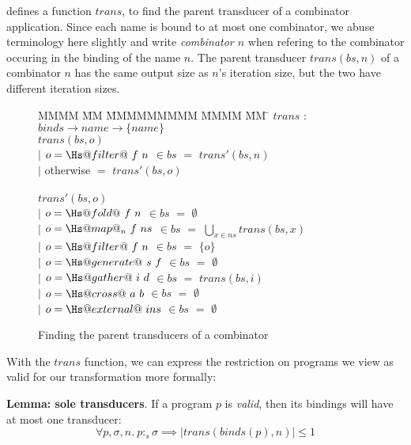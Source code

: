  defines a function $trans$, to find the parent transducer of a combinator application.
Since each name is bound to at most one combinator, we abuse terminology here slightly and write \emph{combinator $n$} when refering to the combinator occuring in the binding of the name $n$.
The parent transducer $trans(bs, n)$ of a combinator $n$ has the same output size as $n$'s iteration size, but the two have different iteration sizes.

\begin{figure}
\begin{tabbing}
MMMM \= MM \= MMMMMMMMM \= MMMM \= MM \= \kill
$trans$  \>$:$\> $binds \rightarrow name \rightarrow \{name\}$ \\
$trans(bs,o)$    \\
            \> $|$ \> $o = \Hs@filter@~f~n$    \> $\in bs$ \> $=$ \> $trans'(bs,n)$ \\
            \> $|$ \> otherwise             \>          \> $=$ \> $trans'(bs,o)$ \\
\\
$trans'(bs,o)$    \\
            \> $|$ \> $o = \Hs@fold@~f~n$      \> $\in bs$ \> $=$ \> $\emptyset$ \\
            \> $|$ \> $o = \Hs@map@_n~f~ns$    \> $\in bs$ \> $=$ \> $\bigcup_{x \in ns} trans(bs, x)$ \\
            \> $|$ \> $o = \Hs@filter@~f~n$    \> $\in bs$ \> $=$ \> $\{o\}$       \\
            \> $|$ \> $o = \Hs@generate@~s~f$  \> $\in bs$ \> $=$ \> $\emptyset$ \\
            \> $|$ \> $o = \Hs@gather@~i~d$    \> $\in bs$ \> $=$ \> $trans(bs,i)$ \\
            \> $|$ \> $o = \Hs@cross@~a~b$     \> $\in bs$ \> $=$ \> $\emptyset$ \\
            \> $|$ \> $o = \Hs@external@~ins$  \> $\in bs$ \> $=$ \> $\emptyset$ \\
\end{tabbing}
\caption{Finding the parent transducers of a combinator}
\label{fig:clustering:trans}
\end{figure}

With the $trans$ function, we can express the restriction on programs we view as valid for our transformation more formally:

\textbf{Lemma: sole transducers}.
If a program $p$ is \emph{valid}, then its bindings will have at most one transducer:
\[
\forall p, \sigma, n.\ p :_s \sigma \implies |trans(binds(p), n)| \le 1
\]

